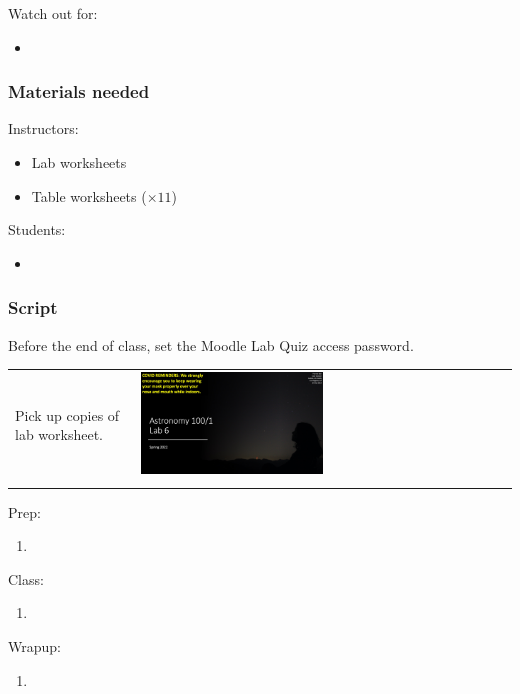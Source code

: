 \documentclass[12pt]{article}
\begin{document}
\noindent
Watch out for:
\begin{itemize}
\item 
\end{itemize}


\subsubsection{Materials needed}

Instructors:
\begin{itemize}
  \item Lab worksheets
  \item Table worksheets ($\times 11$)
\end{itemize}

\noindent
Students:
\begin{itemize}
  \item 
\end{itemize}


\subsubsection{Script}

Before the end of class, set the Moodle Lab Quiz access password.

\begin{longtable}{m{}m{}}
Pick up copies of lab worksheet. & \includegraphics[width=0.5\textwidth]{ppt/lab09/Slide1.jpeg}\\

\label{default}
\end{longtable}

Prep:
\begin{enumerate}
\item
\end{enumerate}

\noindent
Class:
\begin{enumerate}
\item
\end{enumerate}

\noindent
Wrapup:
\begin{enumerate}
\item
\end{enumerate}
\end{document}
